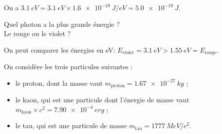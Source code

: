 
\begin{corrige}
On a $\SI{3,1}{eV} =\SI{3,1}{eV}\times \SI{1,6e-19}{J/eV} = \SI{5,0e-19}{J}$.
\end{corrige}



\begin{enonce}
Quel photon a la plus grande énergie ? \minusMedskip\\Le rouge ou le violet ?
\end{enonce}


\begin{corrige}
On peut comparer les énergies en eV: $E_\text{violet} = \SI{3,1}{eV} > \SI{1,55}{eV} =E_\text{rouge}$. 
\end{corrige}


\finEntrainement





\hauteurLargeurCadreReponse		{8mm}{3cm}
\initialisationEntrainement


\debutEntrainement

On considère les trois particules suivantes :
\begin{itemize}
\item le proton, dont la masse vaut $m_{\text{proton}}=\SI{1.67e-27}{kg}$ ;

\item le {kaon}, qui est une particule
dont l'énergie de masse vaut $m_{\text{kaon}} \times c^{2}=\SI{7.90e-4}{erg}$ ;

\item le {tau}, qui est une particule 
de masse $m_{\text{tau}} = \SI{1777}{MeV/c^{2}}$.
\end{itemize}
\smallskip

